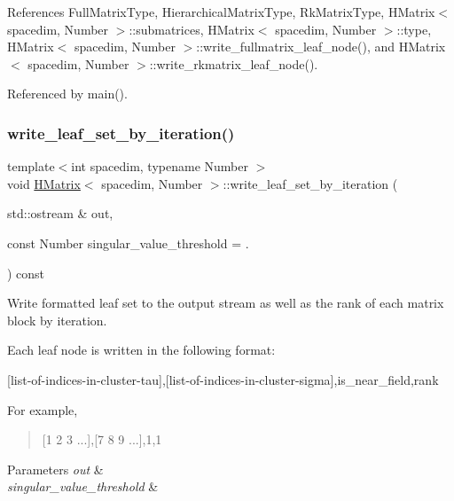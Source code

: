 References Full\+Matrix\+Type, Hierarchical\+Matrix\+Type, Rk\+Matrix\+Type, H\+Matrix$<$ spacedim, Number $>$\+::submatrices, H\+Matrix$<$ spacedim, Number $>$\+::type, H\+Matrix$<$ spacedim, Number $>$\+::write\+\_\+fullmatrix\+\_\+leaf\+\_\+node(), and H\+Matrix$<$ spacedim, Number $>$\+::write\+\_\+rkmatrix\+\_\+leaf\+\_\+node().



Referenced by main().

\mbox{\label{classHMatrix_aac1e1ddbfeb133520dcd50c0174aab8d}} 
\subsubsection{\texorpdfstring{write\+\_\+leaf\+\_\+set\+\_\+by\+\_\+iteration()}{write\_leaf\_set\_by\_iteration()}}
{\footnotesize\ttfamily template$<$int spacedim, typename Number $>$ \\
void \hyperlink{classHMatrix}{H\+Matrix}$<$ spacedim, Number $>$\+::write\+\_\+leaf\+\_\+set\+\_\+by\+\_\+iteration (\begin{DoxyParamCaption}\item[{std\+::ostream \&}]{out,  }\item[{const Number}]{singular\+\_\+value\+\_\+threshold = {.} }\end{DoxyParamCaption}) const}

Write formatted leaf set to the output stream as well as the rank of each matrix block by iteration.

Each leaf node is written in the following format\+:

\begin{quote}


\end{quote}
\mbox{[}list-\/of-\/indices-\/in-\/cluster-\/tau\mbox{]},\mbox{[}list-\/of-\/indices-\/in-\/cluster-\/sigma\mbox{]},is\+\_\+near\+\_\+field,rank

For example,

\begin{quote}
\mbox{[}1 2 3 ...\mbox{]},\mbox{[}7 8 9 ...\mbox{]},1,1 \end{quote}

\begin{DoxyParams}{Parameters}
{\em out} & \\
\hline
{\em singular\+\_\+value\+\_\+threshold} & \\
\hline
\end{DoxyParams}


